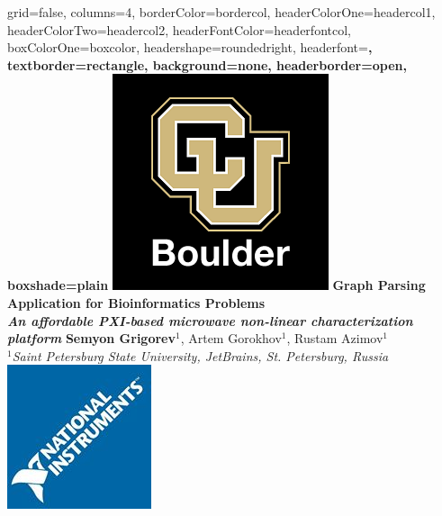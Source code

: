 \documentclass[a0paper,portrait]{baposter}
\begin{document}
\begin{poster}{
grid=false,
columns=4,
borderColor=bordercol, %
headerColorOne=headercol1, %
headerColorTwo=headercol2, %
headerFontColor=headerfontcol, %
boxColorOne=boxcolor, %
headershape=roundedright, %
headerfont=\Large\sf\bf, %
textborder=rectangle,
background=none,
headerborder=open, %
boxshade=plain
}
{\includegraphics[scale=0.3]{CU.png}}
%
%
{ \bf  \huge {Graph Parsing Application for Bioinformatics Problems} \\  \Large \it An affordable PXI-based microwave non-linear characterization platform} %
{\vspace{0.3em} \smaller \textbf{Semyon Grigorev$^1$}, Artem Gorokhov$^1$, Rustam Azimov$^1$ \\  %
\smaller \it $^1${Saint Petersburg State University, JetBrains, St. Petersburg, Russia } \\ %
}
{\includegraphics[scale=0.45]{NI.jpg}} %



\end{poster}
\end{document}
